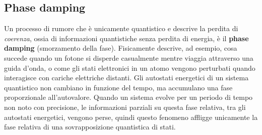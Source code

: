 \subsection{Phase damping}
Un processo di rumore che è unicamente quantistico e descrive la perdita di \textit{coerenza}, ossia di informazioni quantistiche senza perdita di energia, è il \textbf{phase damping} (smorzamento della fase). Fisicamente descrive, ad esempio, cosa succede quando un fotone si disperde casualmente mentre viaggia attraverso una guida d'onda, o come gli stati elettronici in un atomo vengono perturbati quando interagisce con cariche elettriche distanti. Gli autostati energetici di un sistema quantistico non cambiano in funzione del tempo, ma accumulano una fase proporzionale all'autovalore. Quando un sistema evolve per un periodo di tempo non noto con precisione, le informazioni parziali su questa fase relativa, tra gli autostati energetici, vengono perse, quindi questo fenomeno affligge unicamente la fase relativa di una sovrapposizione quantistica di stati. 

